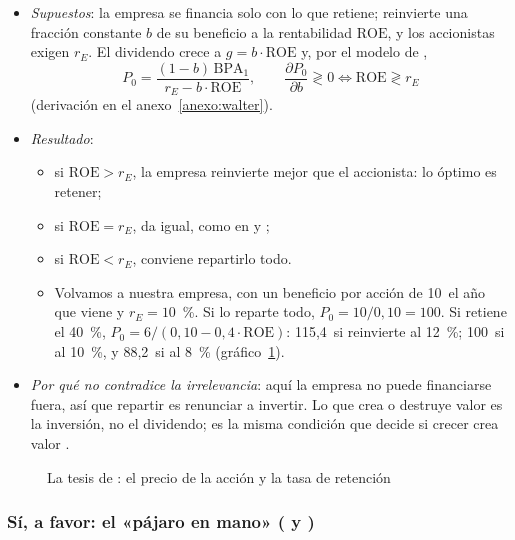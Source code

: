 \documentclass[11pt]{article}
\begin{document}
\begin{itemize}
\item \emph{Supuestos}: la empresa se financia solo con lo que retiene; reinvierte una fracción constante $b$ de su beneficio a la rentabilidad $\mathrm{ROE}$, y los accionistas exigen $r_E$. El dividendo crece a $g=b\cdot\mathrm{ROE}$ y, por el modelo de \textcite{GordonShapiro1956Capital} ,
  \begin{equation}\label{eq:walter}
  P_0=\frac{(1-b)\,\mathrm{BPA}_1}{r_E-b\cdot\mathrm{ROE}},\qquad \frac{\partial P_0}{\partial b}\gtrless0\iff\mathrm{ROE}\gtrless r_E
  \end{equation}
  (derivación en el anexo~\ref{anexo:walter}).
\item \emph{Resultado}\nocite{Walter1956Dividend,Walter1963Dividend}:
  \begin{itemize}
  \item si $\mathrm{ROE}>r_E$, la empresa reinvierte mejor que el accionista: lo óptimo es retener;
  \item si $\mathrm{ROE}=r_E$, da igual, como en  y ;
  \item si $\mathrm{ROE}<r_E$, conviene repartirlo todo.
  \item Volvamos a nuestra empresa, con un beneficio por acción de 10~el año que viene y $r_E=10$~\%. Si lo reparte todo, $P_0=10/0{,}10=100$. Si retiene el 40~\%, $P_0=6/(0{,}10-0{,}4\cdot\mathrm{ROE})$: 115,4~si reinvierte al 12~\%; 100~si al 10~\%, y 88,2~si al 8~\% (gráfico~\ref{fig:walter}).
  \end{itemize}
\item \emph{Por qué no contradice la irrelevancia}: aquí la empresa no puede financiarse fuera, así que repartir es renunciar a invertir. Lo que crea o destruye valor es la inversión, no el dividendo; es la misma condición que decide si crecer crea valor .
\end{itemize}

\begin{figure}[H]
\centering
\caption{La tesis de : el precio de la acción y la tasa de retención}\label{fig:walter}
\end{figure}

\subsubsection{Sí, a favor: el «pájaro en mano» ( y )}\label{sec:pajaro}
\end{document}
